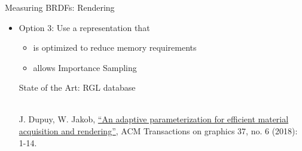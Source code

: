 \documentclass[utf8,stillsansserifmath,fleqn,t]{beamer}
\newcommand{\literature}[1]{{\tiny #1 \par}}
\begin{document}
\begin{frame}
\frametitle{\insertsection}
Measuring BRDFs: Rendering
\begin{itemize}
\item Option 3: Use a representation that
    \begin{itemize}
    \item is optimized to reduce memory requirements
    \item allows Importance Sampling
    \end{itemize}
    State of the Art: RGL database\\~\\
\literature{J. Dupuy, W. Jakob, \href{http://dx.doi.org/10.1145/3272127.3275059}{``An adaptive
parameterization for efficient material acquisition and rendering''}, ACM
Transactions on graphics 37, no. 6 (2018): 1-14.}
\end{itemize}
\end{frame}
\end{document}
